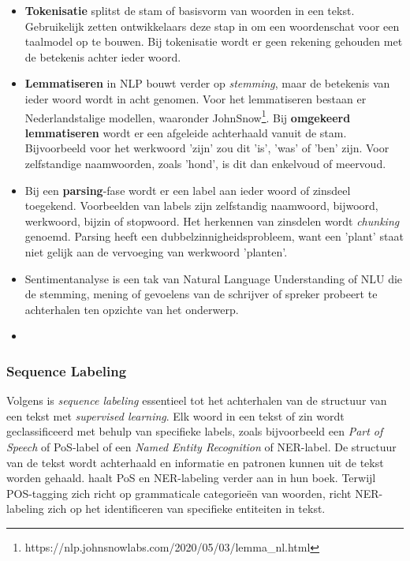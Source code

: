 \begin{itemize}
	\item \textbf{Tokenisatie} splitst de stam of basisvorm van woorden in een tekst. Gebruikelijk zetten ontwikkelaars deze stap in om een woordenschat voor een taalmodel op te bouwen. Bij tokenisatie wordt er geen rekening gehouden met de betekenis achter ieder woord.
	\item \textbf{Lemmatiseren} in NLP bouwt verder op \textit{stemming}, maar de betekenis van ieder woord wordt in acht genomen. Voor het lemmatiseren bestaan er Nederlandstalige modellen, waaronder JohnSnow\footnote{https://nlp.johnsnowlabs.com/2020/05/03/lemma\_nl.html}. Bij \textbf{omgekeerd lemmatiseren} wordt er een afgeleide achterhaald vanuit de stam. Bijvoorbeeld voor het werkwoord 'zijn' zou dit 'is', 'was' of 'ben' zijn. Voor zelfstandige naamwoorden, zoals 'hond', is dit dan enkelvoud of meervoud.
	\item Bij een \textbf{parsing}-fase wordt er een label aan ieder woord of zinsdeel toegekend. Voorbeelden van labels zijn zelfstandig naamwoord, bijwoord, werkwoord, bijzin of stopwoord. Het herkennen van zinsdelen wordt \textit{chunking} genoemd. Parsing heeft een dubbelzinnigheidsprobleem, want een 'plant' staat niet gelijk aan de vervoeging van werkwoord 'planten'.
	\item Sentimentanalyse is een tak van Natural Language Understanding of NLU die de stemming, mening of gevoelens van de schrijver of spreker probeert te achterhalen ten opzichte van het onderwerp. %
	\item 
	
\end{itemize}

\subsubsection{Sequence Labeling}

Volgens \textcite{Eisenstein2019} is \textit{sequence labeling} essentieel tot het achterhalen van de structuur van een tekst met \textit{supervised learning}. Elk woord in een tekst of zin wordt geclassificeerd met behulp van specifieke labels, zoals bijvoorbeeld een \textit{Part of Speech} of PoS-label of een \textit{Named Entity Recognition} of NER-label. De structuur van de tekst wordt achterhaald en informatie en patronen kunnen uit de tekst worden gehaald. \textcite{Jurafsky2014} haalt PoS en NER-labeling verder aan in hun boek. Terwijl POS-tagging zich richt op grammaticale categorieën van woorden, richt NER-labeling zich op het identificeren van specifieke entiteiten in tekst. 

